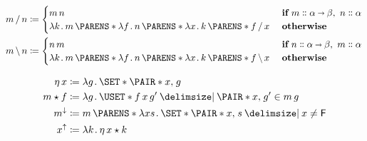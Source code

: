 \documentclass[10pt,fleqn]{article}
\begin{document}
\setlength\abovedisplayskip{0pt}
\setlength\belowdisplayskip{0pt}
\setlength\abovedisplayshortskip{0pt}
\setlength\belowdisplayshortskip{0pt}


\begin{minipage}{0.3\textwidth}
\begin{spreadlines}{0pt}
\begin{align*}
  m \fsl n
  &\coloneq
  \begin{cases}
    m\,n
    &\textbf{if}\ m \dblcolon \alpha\sto\beta,\ n \dblcolon \alpha \\
    \l k \dt m\,\p{\l f \dt n\,\p{\l x \dt k\,\p{f \fsl x}}} \ 
    &\textbf{otherwise}
  \end{cases} \\
  m \bsl n
  &\coloneq
  \begin{cases}
    n\,m
    &\textbf{if}\ n \dblcolon \alpha\sto\beta,\ m \dblcolon \alpha \\
    \l k \dt m\,\p{\l f \dt n\,\p{\l x \dt k\,\p{f \bsl x}}} \ 
    &\textbf{otherwise}
  \end{cases}
\end{align*}
\end{spreadlines}
\end{minipage}
%
%
\begin{minipage}{0.3\textwidth}
\begin{spreadlines}{0pt}
\begin{align*}
  \eta\,x &\coloneq
  \l g \dt \set{\pair{x}{g}} \\
  m \bind f &\coloneq
  \l g \dt \uset{f\,x\,g' \giv \pair{x}{g'} \in m\,g} \\
  m^\dnar &\coloneq
  m\,\p{\l xs \dt \set{\pair{x}{s} \giv x \neq \cn{F}}} \\
  x^\uparrow &\coloneq
  \l k \dt \eta\,x \bind k
\end{align*}
\end{spreadlines}
\end{minipage}

\dotfill
\end{document}
